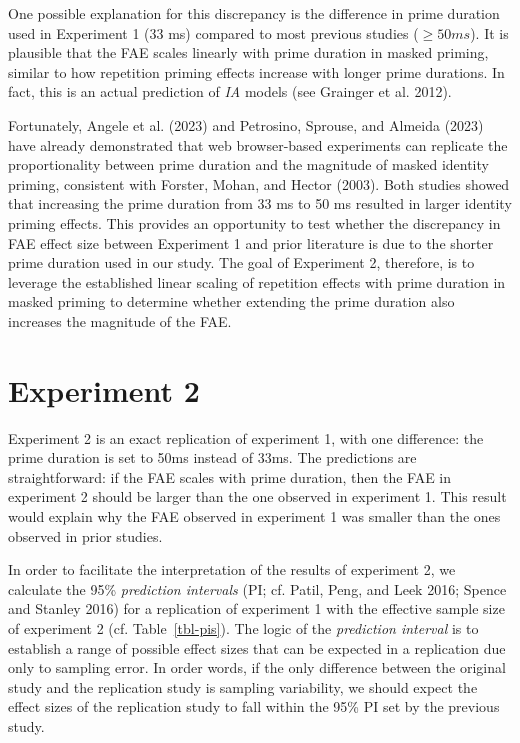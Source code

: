 \documentclass[
]{interact}
\begin{document}
One possible explanation for this discrepancy is the difference in prime
duration used in Experiment 1 (33 ms) compared to most previous studies
(\(\geq 50 ms\)). It is plausible that the FAE scales linearly with
prime duration in masked priming, similar to how repetition priming
effects increase with longer prime durations. In fact, this is an actual
prediction of \emph{IA} models (see Grainger et al. 2012).

Fortunately, Angele et al. (2023) and Petrosino, Sprouse, and Almeida
(2023) have already demonstrated that web browser-based experiments can
replicate the proportionality between prime duration and the magnitude
of masked identity priming, consistent with Forster, Mohan, and Hector
(2003). Both studies showed that increasing the prime duration from 33
ms to 50 ms resulted in larger identity priming effects. This provides
an opportunity to test whether the discrepancy in FAE effect size
between Experiment 1 and prior literature is due to the shorter prime
duration used in our study. The goal of Experiment 2, therefore, is to
leverage the established linear scaling of repetition effects with prime
duration in masked priming to determine whether extending the prime
duration also increases the magnitude of the FAE.

\section{Experiment 2}\label{sec-exp2}

Experiment 2 is an exact replication of experiment 1, with one
difference: the prime duration is set to 50ms instead of 33ms. The
predictions are straightforward: if the FAE scales with prime duration,
then the FAE in experiment 2 should be larger than the one observed in
experiment 1. This result would explain why the FAE observed in
experiment 1 was smaller than the ones observed in prior studies.

In order to facilitate the interpretation of the results of experiment
2, we calculate the 95\% \emph{prediction intervals} (PI; cf. Patil,
Peng, and Leek 2016; Spence and Stanley 2016) for a replication of
experiment 1 with the effective sample size of experiment 2 (cf.
Table~\ref{tbl-pis}). The logic of the \emph{prediction interval} is to
establish a range of possible effect sizes that can be expected in a
replication due only to sampling error. In order words, if the only
difference between the original study and the replication study is
sampling variability, we should expect the effect sizes of the
replication study to fall within the 95\% PI set by the previous study.
\end{document}
